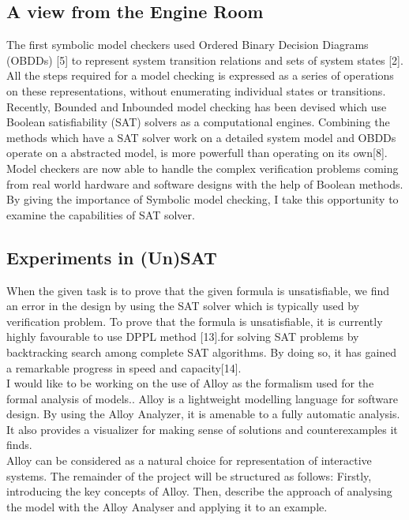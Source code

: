\documentclass[a4paper,12pt]{extarticle}
\begin{document}
\subsection{A view from the Engine Room}
\label{View from engine}
The first symbolic model checkers used Ordered Binary Decision Diagrams (OBDDs) [5] to represent system transition relations and sets of system states [2]. All the steps required for a model checking is expressed as a series of operations on these representations, without enumerating individual states or transitions. Recently, Bounded and Inbounded model checking has been devised which use Boolean satisfiability (SAT) solvers as a computational engines. Combining the methods which have a SAT solver work on a detailed system model and OBDDs operate on a abstracted model, is more powerfull than operating on its own[8].\\
Model checkers are now able to handle the complex verification problems coming from real world hardware and software designs with the help of Boolean methods. By giving the importance of Symbolic model checking, I take this opportunity to examine the capabilities of SAT solver.
\subsection{Experiments in (Un)SAT}
\label{Expt in UnSAT}
When the given task is to prove that the given formula is unsatisfiable, we find an error in the design by using the SAT solver which is typically used by verification problem. To prove that the formula is unsatisfiable, it is currently highly favourable to use DPPL method [13].for solving SAT problems by backtracking search among complete SAT algorithms. By doing so, it has gained a remarkable progress in speed and capacity[14].\\
I would like to be working on the use of Alloy as the formalism used for the formal analysis of models.. Alloy is a lightweight modelling language for software design. By using the Alloy Analyzer, it is amenable to a fully automatic analysis. It also provides a visualizer for making sense of solutions and counterexamples it finds.\\
Alloy can be considered as a natural choice for representation of interactive systems.  The remainder of the project will be structured as follows: Firstly, introducing the key concepts of Alloy. Then, describe the approach of analysing the model with the Alloy Analyser and applying it to an example.
\end{document}
